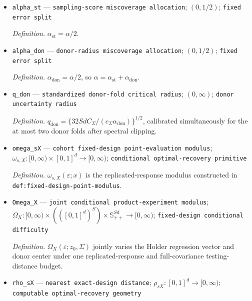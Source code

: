 \documentclass{article}
\begin{document}
\begin{itemize}
  \par\smallskip\noindent\emph{Definition.} \(\mathcal B_s=\{2^{-m}:m=0,\ldots,\lfloor\log_2(b_{0s}^{-1})\rfloor\}\), searched in increasing numerical order; it is nonempty, contains \(1\), and every candidate is at least \(b_{0s}\).
  \item \texttt{alpha\_\allowbreak{}st} --- \texttt{sampling-\allowbreak{}score miscoverage allocation}; \((0,1/2)\); \texttt{fixed error split}
  \par\smallskip\noindent\emph{Definition.} \(\alpha_{\mathrm{st}}=\alpha/2\).
  \item \texttt{alpha\_\allowbreak{}don} --- \texttt{donor-\allowbreak{}radius miscoverage allocation}; \((0,1/2)\); \texttt{fixed error split}
  \par\smallskip\noindent\emph{Definition.} \(\alpha_{\mathrm{don}}=\alpha/2\), so \(\alpha=\alpha_{\mathrm{st}}+\alpha_{\mathrm{don}}\).
  \item \texttt{q\_\allowbreak{}don} --- \texttt{standardized donor-\allowbreak{}fold critical radius}; \((0,\infty)\); \texttt{donor uncertainty radius}
  \par\smallskip\noindent\emph{Definition.} \(q_{\mathrm{don}}=\{32SdC_\Sigma/(c_\Sigma\alpha_{\mathrm{don}})\}^{1/2}\), calibrated simultaneously for the at most two donor folds after spectral clipping.
  \item \texttt{omega\_\allowbreak{}sX} --- \texttt{cohort fixed-\allowbreak{}design point-\allowbreak{}evaluation modulus}; \(\omega_{s,X}:[0,\infty)\times[0,1]^d\to[0,\infty)\); \texttt{conditional optimal-\allowbreak{}recovery primitive}
  \par\smallskip\noindent\emph{Definition.} \(\omega_{s,X}(\varepsilon;x)\) is the replicated-response modulus constructed in \texttt{def:fixed-design-point-modulus}.
  \item \texttt{Omega\_\allowbreak{}X} --- \texttt{joint conditional product-\allowbreak{}experiment modulus}; \(\Omega_X:[0,\infty)\times(([0,1]^d)^S)\times\mathbb S_{++}^{Sd}\to[0,\infty)\); \texttt{fixed-\allowbreak{}design conditional difficulty}
  \par\smallskip\noindent\emph{Definition.} \(\Omega_X(\varepsilon;z_0,\Sigma)\) jointly varies the Holder regression vector and donor center under one replicated-response and full-covariance testing-distance budget.
  \item \texttt{rho\_\allowbreak{}sX} --- \texttt{nearest exact-\allowbreak{}design distance}; \(\rho_{sX}:[0,1]^d\to[0,\infty)\); \texttt{computable optimal-\allowbreak{}recovery geometry}

\end{itemize}
\end{document}
